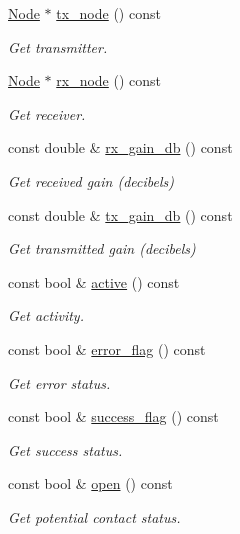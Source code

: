 \begin{DoxyCompactItemize}
\hyperlink{classosse_1_1collaborate_1_1_node}{Node} $\ast$ \hyperlink{classosse_1_1collaborate_1_1_channel_ac156e6d32458cf614675b8fa87866f25}{tx\+\_\+node} () const
\begin{DoxyCompactList}\small\item\em Get transmitter. \end{DoxyCompactList}\item 
\hyperlink{classosse_1_1collaborate_1_1_node}{Node} $\ast$ \hyperlink{classosse_1_1collaborate_1_1_channel_abc1c2e786daa390bcd1cd0982566e5f2}{rx\+\_\+node} () const
\begin{DoxyCompactList}\small\item\em Get receiver. \end{DoxyCompactList}\item 
const double \& \hyperlink{classosse_1_1collaborate_1_1_channel_a4027ef876124bbe4cf0bd4b00acaf884}{rx\+\_\+gain\+\_\+db} () const
\begin{DoxyCompactList}\small\item\em Get received gain (decibels) \end{DoxyCompactList}\item 
const double \& \hyperlink{classosse_1_1collaborate_1_1_channel_ab810753b421db910e6a1ee938a2080af}{tx\+\_\+gain\+\_\+db} () const
\begin{DoxyCompactList}\small\item\em Get transmitted gain (decibels) \end{DoxyCompactList}\item 
const bool \& \hyperlink{classosse_1_1collaborate_1_1_channel_aad77cd18b2279048700dd944aacfa8fc}{active} () const
\begin{DoxyCompactList}\small\item\em Get activity. \end{DoxyCompactList}\item 
const bool \& \hyperlink{classosse_1_1collaborate_1_1_channel_ad6f31877da7e33e97a454bad6d00b93a}{error\+\_\+flag} () const
\begin{DoxyCompactList}\small\item\em Get error status. \end{DoxyCompactList}\item 
const bool \& \hyperlink{classosse_1_1collaborate_1_1_channel_a320df78e3d3cab27387910b653a36c42}{success\+\_\+flag} () const
\begin{DoxyCompactList}\small\item\em Get success status. \end{DoxyCompactList}\item 
const bool \& \hyperlink{classosse_1_1collaborate_1_1_channel_a9cfb391686ccfce59c85e7a72274423e}{open} () const
\begin{DoxyCompactList}\small\item\em Get potential contact status. \end{DoxyCompactList}\end{DoxyCompactItemize}
